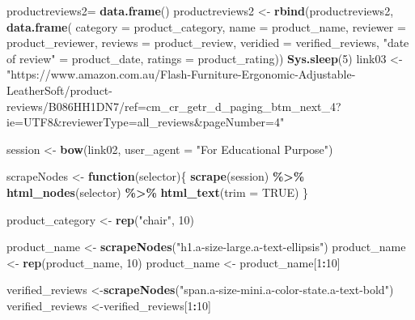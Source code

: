 \documentclass[
]{article}
\newenvironment{Shaded}{\begin{snugshade}}{\end{snugshade}}
\newcommand{\AttributeTok}[1]{\textcolor[rgb]{0.13,0.29,0.53}{#1}}
\newcommand{\ConstantTok}[1]{\textcolor[rgb]{0.56,0.35,0.01}{#1}}
\newcommand{\ControlFlowTok}[1]{\textcolor[rgb]{0.13,0.29,0.53}{\textbf{#1}}}
\newcommand{\DecValTok}[1]{\textcolor[rgb]{0.00,0.00,0.81}{#1}}
\newcommand{\FunctionTok}[1]{\textcolor[rgb]{0.13,0.29,0.53}{\textbf{#1}}}
\newcommand{\NormalTok}[1]{#1}
\newcommand{\OtherTok}[1]{\textcolor[rgb]{0.56,0.35,0.01}{#1}}
\newcommand{\SpecialCharTok}[1]{\textcolor[rgb]{0.81,0.36,0.00}{\textbf{#1}}}
\newcommand{\StringTok}[1]{\textcolor[rgb]{0.31,0.60,0.02}{#1}}
\begin{document}
\begin{Shaded}
\begin{Highlighting}[]
\NormalTok{  productreviews2}\OtherTok{=} \FunctionTok{data.frame}\NormalTok{()}
\NormalTok{  productreviews2 }\OtherTok{\textless{}{-}} \FunctionTok{rbind}\NormalTok{(productreviews2, }\FunctionTok{data.frame}\NormalTok{(}
                      \AttributeTok{category =}\NormalTok{ product\_category,}
                      \AttributeTok{name =}\NormalTok{ product\_name,}
                      \AttributeTok{reviewer =}\NormalTok{ product\_reviewer,}
                      \AttributeTok{reviews =}\NormalTok{ product\_review,}
                      \AttributeTok{veridied =}\NormalTok{ verified\_reviews,}
                      \StringTok{"date of review"} \OtherTok{=}\NormalTok{ product\_date,}
                      \AttributeTok{ratings =}\NormalTok{ product\_rating))}
   \FunctionTok{Sys.sleep}\NormalTok{(}\DecValTok{5}\NormalTok{)}
\NormalTok{link03 }\OtherTok{\textless{}{-}} \StringTok{"https://www.amazon.com.au/Flash{-}Furniture{-}Ergonomic{-}Adjustable{-}LeatherSoft/product{-}reviews/B086HH1DN7/ref=cm\_cr\_getr\_d\_paging\_btm\_next\_4?ie=UTF8\&reviewerType=all\_reviews\&pageNumber=4"}


\NormalTok{  session }\OtherTok{\textless{}{-}} \FunctionTok{bow}\NormalTok{(link02,}
               \AttributeTok{user\_agent =} \StringTok{"For Educational Purpose"}\NormalTok{)}

\NormalTok{  scrapeNodes }\OtherTok{\textless{}{-}} \ControlFlowTok{function}\NormalTok{(selector)\{}
    \FunctionTok{scrape}\NormalTok{(session) }\SpecialCharTok{\%\textgreater{}\%}
      \FunctionTok{html\_nodes}\NormalTok{(selector) }\SpecialCharTok{\%\textgreater{}\%}
      \FunctionTok{html\_text}\NormalTok{(}\AttributeTok{trim =} \ConstantTok{TRUE}\NormalTok{)}
\NormalTok{  \}}

\NormalTok{  product\_category }\OtherTok{\textless{}{-}} \FunctionTok{rep}\NormalTok{(}\StringTok{"chair"}\NormalTok{, }\DecValTok{10}\NormalTok{)}

\NormalTok{  product\_name }\OtherTok{\textless{}{-}} \FunctionTok{scrapeNodes}\NormalTok{(}\StringTok{"h1.a{-}size{-}large.a{-}text{-}ellipsis"}\NormalTok{)}
\NormalTok{  product\_name }\OtherTok{\textless{}{-}} \FunctionTok{rep}\NormalTok{(product\_name, }\DecValTok{10}\NormalTok{)}
\NormalTok{  product\_name }\OtherTok{\textless{}{-}}\NormalTok{ product\_name[}\DecValTok{1}\SpecialCharTok{:}\DecValTok{10}\NormalTok{]}
  
\NormalTok{  verified\_reviews }\OtherTok{\textless{}{-}}\FunctionTok{scrapeNodes}\NormalTok{(}\StringTok{"span.a{-}size{-}mini.a{-}color{-}state.a{-}text{-}bold"}\NormalTok{)}
\NormalTok{  verified\_reviews }\OtherTok{\textless{}{-}}\NormalTok{verified\_reviews[}\DecValTok{1}\SpecialCharTok{:}\DecValTok{10}\NormalTok{]}
  

\end{Highlighting}
\end{Shaded}
\end{document}
